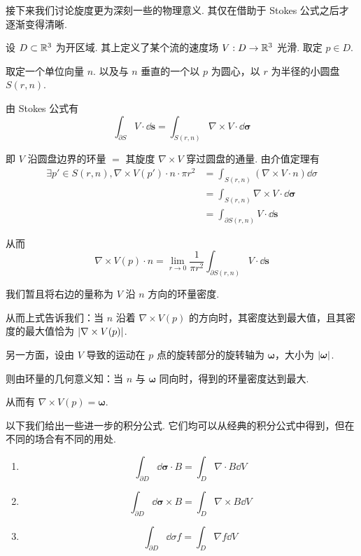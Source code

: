 接下来我们讨论旋度更为深刻一些的物理意义. 其仅在借助于 Stokes 公式之后才逐渐变得清晰.

设 $D\subset\mathbb{R}^3$ 为开区域. 其上定义了某个流的速度场 $V:D\to\mathbb{R}^3$ 光滑. 取定 $p\in D$.

取定一个单位向量 $n$. 以及与 $n$ 垂直的一个以 $p$ 为圆心，以 $r$ 为半径的小圆盘 $S(r,n)$.


由 Stokes 公式有
$$
\int_{\partial S}V\cdot\dd\mathbf{s}=\int_{S(r,n)}\nabla\times V\cdot\dd\bm{\sigma}
$$

即 $V$ 沿圆盘边界的环量 $=$ 其旋度 $\nabla\times V$ 穿过圆盘的通量. 由介值定理有
$$
\begin{aligned}
    \exists p'\in S(r,n),\nabla\times V(p')\cdot n\cdot\pi r^2&=\int_{S(r,n)}(\nabla\times V\cdot n)\dd\sigma\\
    &=\int_{S(r,n)}\nabla\times V\cdot\dd\bm{\sigma}\\
    &=\int_{\partial S(r,n)}V\cdot\dd\mathbf{s}    
\end{aligned}
$$

从而
$$
\nabla\times V(p)\cdot n=\lim_{r\to 0}\frac{1}{\pi r^2}\int_{\partial S(r,n)}V\cdot\dd\mathbf{s}
$$

我们暂且将右边的量称为 $V$ 沿 $n$ 方向的环量密度.

从而上式告诉我们：当 $n$ 沿着 $\nabla\times V(p)$ 的方向时，其密度达到最大值，且其密度的最大值恰为 $\lvert{\nabla\times V(p)}\rvert$.

另一方面，设由 $V$ 导致的运动在 $p$ 点的旋转部分的旋转轴为 $\bm{\omega}$，大小为 $\lvert{\bm{\omega}}\rvert$.

则由环量的几何意义知：当 $n$ 与 $\bm{\omega}$ 同向时，得到的环量密度达到最大.


从而有 $\nabla\times V(p)=\bm{\omega}$.


以下我们给出一些进一步的积分公式. 它们均可以从经典的积分公式中得到，但在不同的场合有不同的用处.


\begin{property}
    \begin{enumerate}
        \item\label{G-O1}
$$
\int_{\partial D}\dd\bm{\sigma}\cdot B=\int_D\nabla\cdot B\dd V
$$

        \item\label{G-O2}
$$
\int_{\partial D}\dd\bm{\sigma}\times B=\int_D\nabla\times B\dd V
$$

        \item\label{G-O3}
$$
\int_{\partial D}\dd\sigma f=\int_D\nabla f\dd V
$$
    \end{enumerate}
\end{property}

